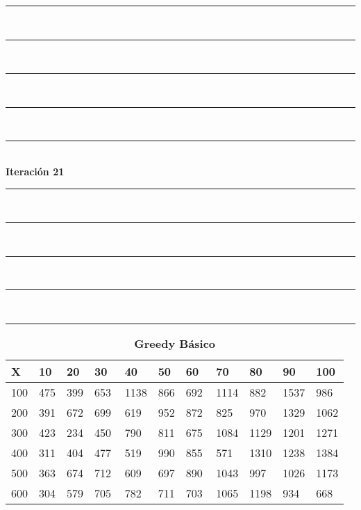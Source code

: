 \documentclass[10pt,letterpaper]{article}
\begin{document}
\newpage 
\begin{center}
\newcommand{\HRule}{\rule{\linewidth}{0.5mm}}
\center
\HRule\\[6cm]
\HRule\\[0.4cm]
\HRule\\[0.4cm]
\HRule\\[0.4cm]
\HRule\\[0.4cm]
{\centering \Huge\bfseries Iteración 21}\\[0.4cm]
\HRule\\[0.4cm]
\HRule\\[0.4cm]
\HRule\\[0.4cm]
\HRule\\[6cm]
\HRule
\end{center}
\newpage 
{}
\begin{center}
\begin{table}\renewcommand{\arraystretch}{2.5}
\caption{\large \textbf{Greedy Básico}}
\centering
\begin{tabular} { |m{0.5cm}|m{1.3cm}|m{1.3cm}|m{1.3cm}|m{1.3cm}|m{1.3cm}|m{1.3cm}|m{1.3cm}|m{1.3cm}|m{1.3cm}|m{1.3cm}|} 
\hline
\rowcolor{Gray}
\centering \textbf{X} & \centering \textbf{10} & \centering \textbf{20} & \centering \textbf{30}\ & \centering \textbf{40} & \centering \textbf{50} & \centering \textbf{60}\ & \centering \textbf{70} & \centering \textbf{80} & \centering \textbf{90}\ & \textbf{100} \\\hline
\cellcolor{Gray}100 & \Large 475 & \Large 399 & \Large 653 & \Large 1138 & \Large 866 & \Large 692 & \Large 1114 & \Large 882 & \Large 1537 & \Large 986 \\
\hline
\cellcolor{Gray}200 & \Large 391 & \Large 672 & \Large 699 & \Large 619 & \Large 952 & \Large 872 & \Large 825 & \Large 970 & \Large 1329 & \Large 1062 \\
\hline
\cellcolor{Gray}300 & \Large 423 & \Large 234 & \Large 450 & \Large 790 & \Large 811 & \Large 675 & \Large 1084 & \Large 1129 & \Large 1201 & \Large 1271 \\
\hline
\cellcolor{Gray}400 & \Large 311 & \Large 404 & \Large 477 & \Large 519 & \Large 990 & \Large 855 & \Large 571 & \Large 1310 & \Large 1238 & \Large 1384 \\
\hline
\cellcolor{Gray}500 & \Large 363 & \Large 674 & \Large 712 & \Large 609 & \Large 697 & \Large 890 & \Large 1043 & \Large 997 & \Large 1026 & \Large 1173 \\
\hline
\cellcolor{Gray}600 & \Large 304 & \Large 579 & \Large 705 & \Large 782 & \Large 711 & \Large 703 & \Large 1065 & \Large 1198 & \Large 934 & \Large 668 \\

\end{tabular}
\end{table}
\end{center}
\end{document}
